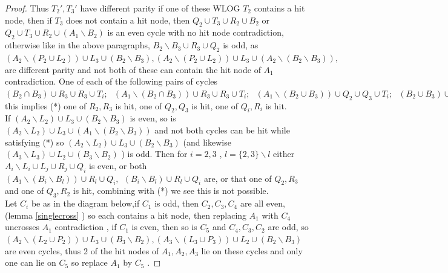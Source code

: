 \documentclass[letterpaper,11pt]{article}
\newcommand{\0}{\mathbb{0}}
\newcommand{\1}{\mathbb{1}}
\begin{document}
\begin{proof}
Thus $T_2', T_3'$ have different parity if one of these WLOG $T_2$ contains a hit node, then if $T_3$ does not contain a hit node, then  $Q_2 \cup T_3 \cup R_2 \cup B_2 $   or  $Q_2 \cup T_3 \cup R_2 \cup ( A_1 \backslash B_2 ) $  is an even cycle with no hit node contradiction, otherwise like in the above paragraphs, $B_2 \backslash B_3 \cup R_3 \cup Q_2$ is odd,  as $ (A_2 \backslash (P_2 \cup L_2 )  ) \cup L_3 \cup ( B_2 \backslash B_3 ),  (A_2 \backslash (P_2 \cup L_2 ) ) \cup L_3 \cup (A_2 \backslash ( B_2 \backslash B_3 )  ), $ are different parity and not both of these can contain the hit node of $A_1$ contradiction. One of each of the following pairs of cycles   $ (B_2 \cap B_3 ) \cup R_3 \cup R_3 \cup T_i  ; \ \ \ ( A_1 \backslash (B_2 \cap B_3 ) ) \cup R_3 \cup R_3 \cup T_i  ; \ \ \   (A_1 \backslash  (B_2 \cup B_3 ) ) \cup Q_2 \cup Q_3 \cup T_i ; \ \ \  (B_2 \cup B_3 )  \cup Q_2 \cup Q_3 \cup T_i ; \ \ \ (A_3 \backslash T_3) \cup T_i ; \ \ (A_2 \backslash T_2) \cup T_i $ 
   this implies (*) one of $R_2, R_3$ is hit, one of $Q_2, Q_3$ is hit, one of $ Q_i, R_i$ is hit.  \\
   If $ (A_2 \backslash  L_2) \cup  L_3 \cup (B_2 \backslash B_3) $ is even, so is $ (A_2 \backslash  L_2) \cup  L_3 \cup (  A_1 \backslash ( B_2 \backslash B_3  ) ) $ and not both cycles can be hit while satisfying (*) so   $ (A_2 \backslash  L_2) \cup  L_3 \cup (B_2 \backslash B_3) $ (and likewise  $ (A_3 \backslash  L_3) \cup  L_2 \cup (B_3 \backslash B_2) $ )  is odd. Then for $i=2,3$  , $l= \{2,3 \} \backslash l $ either $  A_i \backslash L_i \cup L_j \cup R_j  \cup Q_i $ is even, or both $( A_1 \backslash ( B_i \backslash B_l  ) ) \cup  R_l \cup Q_i ,  \ \ ( B_i \backslash B_l   ) \cup  R_l \cup Q_i $ are, or that one of $Q_2 ,R_3$ and one of $Q_3 , R_2 $ is hit, combining with (*) we see this is not possible.  \\
   Let $C_i$ be as in the diagram below,if $C_1$ is odd, then $C_2, C_3 , C_4 $ are all even, (lemma \ref{singlecross} ) so each contains a hit node,  then replacing $A_1$ with   $C_4$ uncrosses $A_1$ contradiction , if $C_1$ is even, then  
 so is $C_5$  and $C_4, C_3, C_2 $ are odd, so   $ ( A_2 \backslash (L_2 \cup P_2) )  \cup L_3 \cup (B_3 \backslash B_2 ) ,  ( A_3 \backslash (L_3\cup P_3) )  \cup L_2 \cup (B_2 \backslash B_3 )   $  are even cycles, thus 2 of the hit nodes of $ A_1, A_2, A_3$  lie on these cycles and only one can lie on $C_5$ so replace $A_1$ by $C_5$ .

\end{proof}
\end{document}

